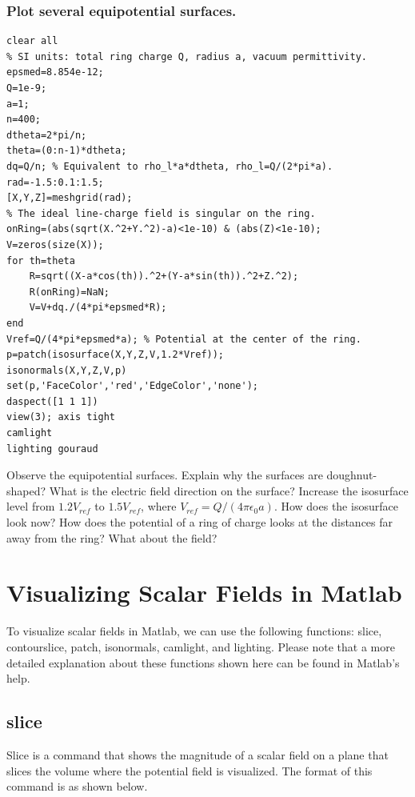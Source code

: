 \documentclass{ximera}
\begin{document}
\subsubsection{ Plot several equipotential surfaces. }




\begin{verbatim}
clear all
% SI units: total ring charge Q, radius a, vacuum permittivity.
epsmed=8.854e-12;
Q=1e-9;
a=1;
n=400;
dtheta=2*pi/n;
theta=(0:n-1)*dtheta;
dq=Q/n; % Equivalent to rho_l*a*dtheta, rho_l=Q/(2*pi*a).
rad=-1.5:0.1:1.5;
[X,Y,Z]=meshgrid(rad);
% The ideal line-charge field is singular on the ring.
onRing=(abs(sqrt(X.^2+Y.^2)-a)<1e-10) & (abs(Z)<1e-10);
V=zeros(size(X));
for th=theta
    R=sqrt((X-a*cos(th)).^2+(Y-a*sin(th)).^2+Z.^2);
    R(onRing)=NaN;
    V=V+dq./(4*pi*epsmed*R);
end
Vref=Q/(4*pi*epsmed*a); % Potential at the center of the ring.
p=patch(isosurface(X,Y,Z,V,1.2*Vref));
isonormals(X,Y,Z,V,p)
set(p,'FaceColor','red','EdgeColor','none');
daspect([1 1 1])
view(3); axis tight
camlight
lighting gouraud
\end{verbatim}



Observe the equipotential surfaces. Explain why the surfaces are doughnut-shaped? What is the electric field direction on the surface? Increase the isosurface level from $1.2V_{ref}$ to $1.5V_{ref}$, where $V_{ref}=Q/(4\pi\epsilon_0 a)$. How does the isosurface look now? How does the potential of a ring of charge looks at the distances far away from the ring? What about the field?







\section{Visualizing Scalar Fields in Matlab}

To visualize scalar fields in Matlab, we can use the following functions: slice, contourslice, patch, isonormals, camlight, and lighting. Please note that a more detailed explanation about these functions shown here can be found in Matlab's help.

\subsection{slice}
 
Slice is a command that shows the magnitude of a scalar field on a plane that slices the volume where the potential field is visualized. The format of this command is as shown below.
\end{document}
